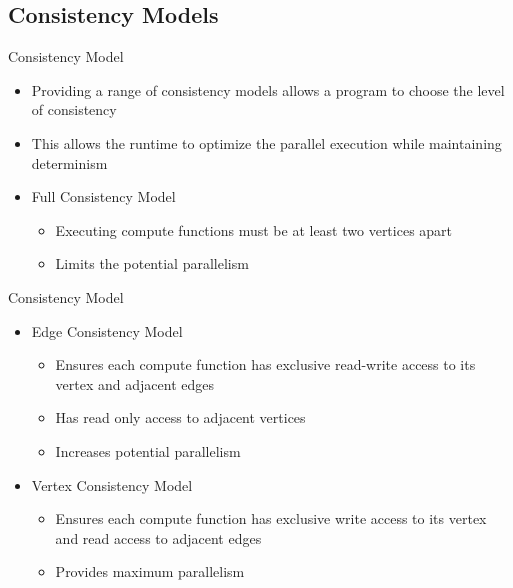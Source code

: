 \subsection{Consistency Models}

\begin{frame}{Consistency Model}
	 \begin{itemize}
	 \item Providing a range of consistency models allows a program to choose the level of
consistency
	 \item This allows the runtime to optimize the parallel execution while maintaining determinism
		\item Full Consistency Model
		 \begin{itemize}
				 \item Executing compute functions must be at least two vertices apart
				 \item Limits the potential parallelism
			 \end{itemize}
		 \end{itemize}
	\let\thefootnote\relax{}
	 \end{frame}

	 \begin{frame}{Consistency Model}
	 	 \begin{itemize}
			 \item Edge Consistency Model
			 \begin{itemize}
				 \item Ensures each compute function has exclusive read-write access to its
vertex and adjacent edges
				 \item Has read only access to adjacent vertices
				 \item Increases potential parallelism
			 \end{itemize}
					 \item Vertex Consistency Model
			 \begin{itemize}
				 \item Ensures each compute function has exclusive write access to its
vertex and read access to adjacent edges
				 \item Provides maximum parallelism
			 \end{itemize}
		 \end{itemize}
	\let\thefootnote\relax{}
	 \end{frame}

